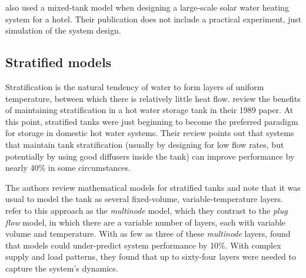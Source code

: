 \textcite{Cao14} also used a mixed-tank model when designing a large-scale solar water heating system for a hotel.
Their publication does not include a practical experiment, just simulation of the system design.

\subsection{Stratified models}
\label{sec:review:stratified-tank-models}

Stratification is the natural tendency of water to form layers of uniform temperature, between which there is relatively little heat flow.
\textcite{Hollands89} review the benefits of maintaining stratification in a hot water storage tank in their 1989 paper.
At this point, stratified tanks were just beginning to become the preferred paradigm for storage in domestic hot water systems.
Their review points out that systems that maintain tank stratification (usually by designing for low flow rates, but potentially by using good diffusers inside the tank) can improve performance by nearly 40\% in some circumstances.

The authors review mathematical models for stratified tanks and note that it was usual to model the tank as several fixed-volume, variable-temperature layers.
\textcite{Kleinbach93} refer to this approach as the \emph{multinode} model, which they contrast to the \emph{plug flow} model, in which there are a variable number of layers, each with variable volume and temperature.
With as few as three of these \emph{multinode} layers,  found that models could under-predict system performance by 10\%.
With complex supply and load patterns, they found that up to sixty-four layers were needed to capture the system's dynamics.

